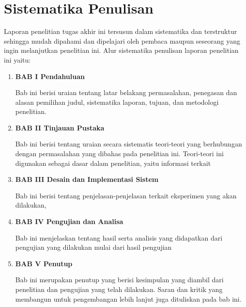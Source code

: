 \section{Sistematika Penulisan}
\label{sec:sistematikapenulisan}

Laporan penelitian tugas akhir ini tersusun dalam sistematika dan terstruktur sehingga mudah dipahami dan dipelajari oleh pembaca maupun seseorang yang ingin melanjutkan penelitian ini.
Alur sistematika penulisan laporan penelitian ini yaitu:

\begin{enumerate}[nolistsep]

  \item \textbf{BAB I Pendahuluan}

  Bab ini berisi uraian tentang latar belakang permasalahan, penegasan dan alasan pemilihan judul, sistematika laporan, tujuan, dan metodologi penelitian.

  \vspace{2ex}

  \item \textbf{BAB II Tinjauan Pustaka}

  Bab ini berisi tentang uraian secara sistematis teori-teori yang berhubungan dengan permasalahan yang dibahas pada penelitian ini.
  Teori-teori ini digunakan sebagai dasar dalam penelitian, yaitu informasi terkait \textcolor{red}{\lipsum[1][1-2]}

  \vspace{2ex}

  \item \textbf{BAB III Desain dan Implementasi Sistem}

  Bab ini berisi tentang penjelasan-penjelasan terkait eksperimen yang akan dilakukan, \textcolor{red}{\lipsum[1][1-3]}

  \vspace{2ex}

  \item \textbf{BAB IV Pengujian dan Analisa}

  Bab ini menjelaskan tentang hasil serta analisis yang didapatkan dari pengujian yang dilakukan mulai dari hasil pengujian \textcolor{red}{\lipsum[1][1-2]}

  \vspace{2ex}

  \item \textbf{BAB V Penutup}

  Bab ini merupakan penutup yang berisi kesimpulan yang diambil dari penelitian dan pengujian yang telah dilakukan.
  Saran dan kritik yang membangun untuk pengembangan lebih lanjut juga dituliskan pada bab ini.

\end{enumerate}
